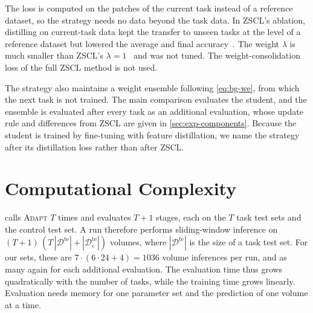 The loss is computed on the patches of the current task instead of a reference dataset, so the strategy needs no data beyond the task data.
In ZSCL's ablation, distilling on current-task data kept the transfer to unseen tasks at the level of a reference dataset but lowered the average and final accuracy~\cite[Table~1b]{zheng2023preventingzeroshottransferdegradation}.
The weight $\lambda$ is much smaller than ZSCL's $\lambda = 1$~\cite[App.~B]{zheng2023preventingzeroshottransferdegradation} and was not tuned.
The weight-consolidation loss of the full ZSCL method is not used.

The strategy also maintains a weight ensemble following \cref{eq:bg-we}, from which the next task is not trained.
The main comparison evaluates the student, and the ensemble is evaluated after every task as an additional evaluation, whose update rule and differences from ZSCL are given in \cref{sec:exp-components}.
Because the student is trained by fine-tuning with feature distillation, we name the strategy after its distillation loss rather than after ZSCL.

\section{Computational Complexity}
\label{sec:method-complexity}

 calls \textsc{Adapt} $T$ times and evaluates $T+1$ stages, each on the $T$ task test sets and the control test set.
A run therefore performs sliding-window inference on $(T+1)\,(T\,|\mathcal{D}^{\mathrm{te}}| + |\mathcal{D}_c^{\mathrm{te}}|)$ volumes, where $|\mathcal{D}^{\mathrm{te}}|$ is the size of a task test set.
For our sets, these are $7 \cdot (6 \cdot 24 + 4) = 1036$ volume inferences per run, and as many again for each additional evaluation.
The evaluation time thus grows quadratically with the number of tasks, while the training time grows linearly.
Evaluation needs memory for one parameter set and the prediction of one volume at a time.

